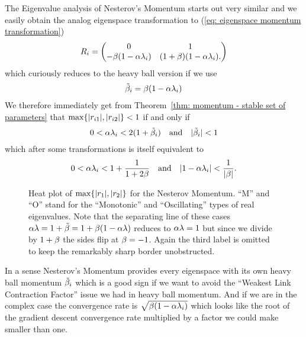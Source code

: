 The Eigenvalue analysis of Nesterov's Momentum starts out very similar and we
easily obtain the analog eigenspace transformation to (\ref{eq: eigenspace
momentum transformation})
%
\begin{align*}
	R_i = \begin{pmatrix}
		0 & 1\\
		-\beta(1-\alpha\lambda_i) & (1+\beta)(1-\alpha\lambda_i).
	\end{pmatrix}	
\end{align*}
%
which curiously reduces to the heavy ball version if we use
\begin{align}\label{eq: tilde momentum}
	\tilde{\beta}_i = \beta(1-\alpha\lambda_i)
\end{align}
We therefore immediately get from Theorem~\ref{thm: momentum - stable set of
parameters} that \(\max\{|r_{i1}|,|r_{i2}|\}<1\) if and only if
\begin{align*}
	0<\alpha\lambda_i < 2(1+\tilde{\beta}_i)
	\quad \text{and} \quad
	|\tilde{\beta}_i|<1
\end{align*}
%
which after some transformations is itself equivalent to
\begin{align*}
	0<\alpha\lambda_i < 1+\frac{1}{1+2\beta}
	\quad \text{and} \quad
	|1-\alpha\lambda_i|<\frac{1}{|\beta|}.
\end{align*}
%
\begin{figure}[h]
	\centering
	\def\svgwidth{1\textwidth}
	
	\caption{
		Heat plot of \(\max\{|r_1|,|r_2|\}\) for the Nesterov Momentum.
		``M'' and ``O'' stand for the ``Monotonic'' and ``Oscillating'' types of 
		real eigenvalues. Note that the separating line of these cases
		\(\alpha\lambda=1+\tilde{\beta}=1+\beta(1-\alpha\lambda)\)
		reduces to \(\alpha\lambda=1\) but since we divide by \(1+\beta\)
		the sides flip at \(\beta=-1\). Again the third label is omitted to
		keep the remarkably sharp border unobstructed.
	}
	\label{fig: annotated nesterov rates}
\end{figure}

In a sense Nesterov's Momentum provides every eigenspace with its own
heavy ball momentum \(\tilde{\beta}_i\) which is a good sign if we want
to avoid the ``Weakest Link Contraction Factor'' issue we had in heavy ball
momentum. And if we are in the complex case the convergence rate is
\(\sqrt{\beta(1-\alpha\lambda_i)}\) which looks like the root of the gradient
descent convergence rate multiplied by a factor we could make smaller than one.

